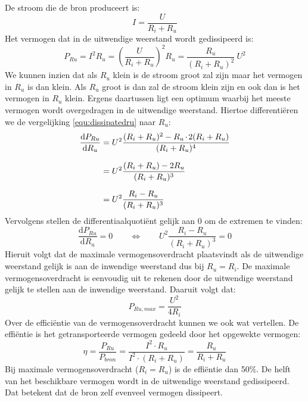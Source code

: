 De stroom die de bron produceert is:
%
\begin{equation}
I = \dfrac{U}{R_i + R_u}
\end{equation}
%
Het vermogen dat in de uitwendige weerstand wordt gedissipeerd is:
%
\begin{equation}
\label{equ:dissipatedru}
P_{Ru} = I^2R_u = \left(\dfrac{U}{R_i+R_u}\right)^2 R_u
       = \dfrac{R_u}{(R_i+R_u)^2}\: U^2
\end{equation}
%
We kunnen inzien dat als $R_u$ klein is de stroom groot zal zijn maar het vermogen in $R_u$ is
dan klein. Als $R_u$ groot is dan zal de stroom klein zijn en ook dan is het
vermogen in $R_u$ klein. Ergens daartussen ligt een optimum waarbij het meeste vermogen
wordt overgedragen in de uitwendige weerstand. Hiertoe differenti\"eren we de vergelijking
\eqref{equ:dissipatedru} naar $R_u$:
%
\begin{equation}
\setlength{\jot}{10pt}
\begin{split}
\dfrac{\text{d}P_{Ru}}{\text{d}R_u} &= U^2\dfrac{(R_i+R_u)^2-R_u\cdot2(R_i+R_u)}{(R_i+R_u)^4} \\
      &= U^2 \dfrac{(R_i+R_u)-2R_u}{(R_i+R_u)^3} \\
      &= U^2 \dfrac{R_i-R_u}{(R_i+R_u)^3}
\end{split}
\end{equation}
%
Vervolgens stellen de differentiaalquoti\"ent gelijk aan 0 om de extremen te vinden:
%
\begin{equation}
\dfrac{\text{d}P_{Ru}}{\text{d}R_u} = 0 \qquad \Longleftrightarrow \qquad U^2 \dfrac{R_i-R_u}{(R_i+R_u)^3} = 0
\end{equation}
%
Hieruit volgt dat de maximale vermogensoverdracht plaatsvindt als de uitwendige
weerstand gelijk is aan de inwendige weerstand dus bij $R_u=R_i$. De maximale
vermogensoverdracht is eenvoudig uit te rekenen door de uitwendige weerstand
gelijk te stellen aan de inwendige weerstand. Daaruit volgt dat:
%
\begin{equation}
P_{Ru,max} = \dfrac{U^2}{4R_i}
\end{equation}
%
Over de effici\"entie van de vermogensoverdracht kunnen we ook wat vertellen. De effi\"entie is
het getransporteerde vermogen gedeeld door het opgewekte vermogen:
%
\begin{equation}
\eta = \dfrac{P_{Ru}}{P_{bron}} = \dfrac{I^2\cdot R_u}{I^2\cdot(R_i+R_u)} = \dfrac{R_u}{R_i+R_u}
\end{equation}
%
Bij maximale vermogensoverdracht ($R_i=R_u$) is de effi\"entie dan 50\%. De helft van het beschikbare
vermogen wordt in de uitwendige weerstand gedissipeerd. Dat betekent dat de bron zelf evenveel vermogen
dissipeert.

